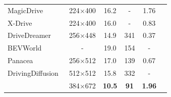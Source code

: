\begin{table}[t!]
\begin{minipage}[t]{\linewidth}
\begin{tabular}{lccccc}
MagicDrive~\cite{gao2023magicdrive}& 224$\times$400&  16.2 & - & 1.76\\
X-Drive~\cite{xie2024x} &  224$\times$400 &  16.0 & - & 0.83\\
DriveDreamer~\cite{wang2023drivedreamer} & 256$\times$448& 14.9 & 341& 0.37\\
BEVWorld~\cite{zhang2024bevworld} & - & 19.0 & 154 & -\\
Panacea~\cite{wen2024panacea} & 256$\times$512 & 17.0 & 139 & 0.67\\
DrivingDiffusion~\cite{li2024drivingdiffusion} & 512$\times$512 & 15.8 & 332 & -\\
\midrule
\ourmethod{} & 384$\times$672 & \textbf{10.5}& \textbf{91} & \textbf{1.96}\\
\bottomrule
\end{tabular}
\end{minipage}
\vspace{-10pt}
\end{table}


